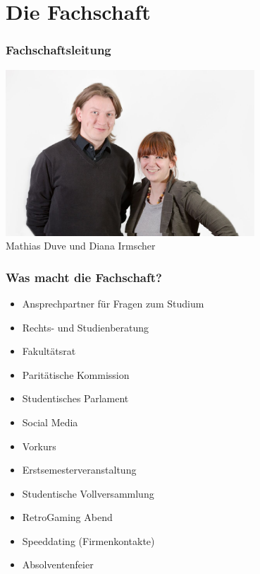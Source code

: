 \documentclass{beamer}
\begin{document}
	\section{Die Fachschaft}
	
	\begin{frame}[t]
		\frametitle{Fachschaftsleitung}
		\center
		\includegraphics[width=0.7\textwidth]{matti_diana.jpg}
		\\Mathias Duve und Diana Irmscher
	\end{frame}
	
	\begin{frame}[t]
		\frametitle{Was macht die Fachschaft?}
		
		\begin{itemize}
			\item Ansprechpartner für Fragen zum Studium
			\item Rechts- und Studienberatung
			\item Fakultätsrat
			\item Paritätische Kommission
			\item Studentisches Parlament
			\item Social Media
		\end{itemize}
		\bigskip
		\begin{itemize}
			\item Vorkurs
			\item Erstsemesterveranstaltung
			\item Studentische Vollversammlung
			\item RetroGaming Abend
			\item Speeddating (Firmenkontakte)
			\item Absolventenfeier
		\end{itemize}
	\end{frame}
	
\end{document}
